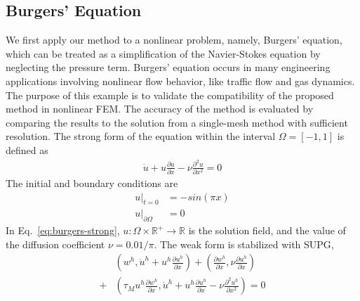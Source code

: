 \documentclass[preprint,12pt,sort&compress]{elsarticle}
\theoremstyle{definition}%
\begin{document}
\subsection{Burgers' Equation}
We first apply our method to a nonlinear problem, namely, Burgers' equation, which can be treated as a simplification of the Navier-Stokes equation by neglecting the pressure term.
Burgers' equation occurs in many engineering applications involving nonlinear flow behavior, like traffic flow and gas dynamics.
The purpose of this example is to validate the compatibility of the proposed method in nonlinear FEM.
The accuracy of the method is evaluated by comparing the results to the solution from a single-mesh method with sufficient resolution. 
The strong form of the equation within the interval $\Omega=[-1, 1]$ is defined as
\begin{align}\label{eq:burgers-strong}
    \dot{u}+u\frac{\partial u}{\partial x} - \nu \frac{\partial^2 u}{\partial x^2}=0
\end{align}
The initial and boundary conditions are
\begin{align}
    u|_{t=0} & = -sin(\pi x)\\
    u|_{\partial \Omega}&=0
\end{align}
In Eq.~\ref{eq:burgers-strong}, $u:\Omega\times\mathbb{R}^+\rightarrow\mathbb{R}$ is the solution field, and the value of the
diffusion coefficient $\nu=0.01/\pi$.
The weak form is stabilized with SUPG,
\begin{align}
  \nonumber &\left(w^h, \dot{u}^h+u^h\frac{\partial u^h}{\partial x}\right)
  +\left(\frac{\partial w^h}{\partial x},\nu\frac{\partial u^h}{\partial x}\right) \\
  +&\left(\tau_M u^h\frac{\partial w^h}{\partial x}, \dot{u}^h+u^h\frac{\partial u^h}{\partial x}-\nu\frac{\partial^2 u^h}{\partial x^2}\right)= 0
\end{align}
\end{document}
